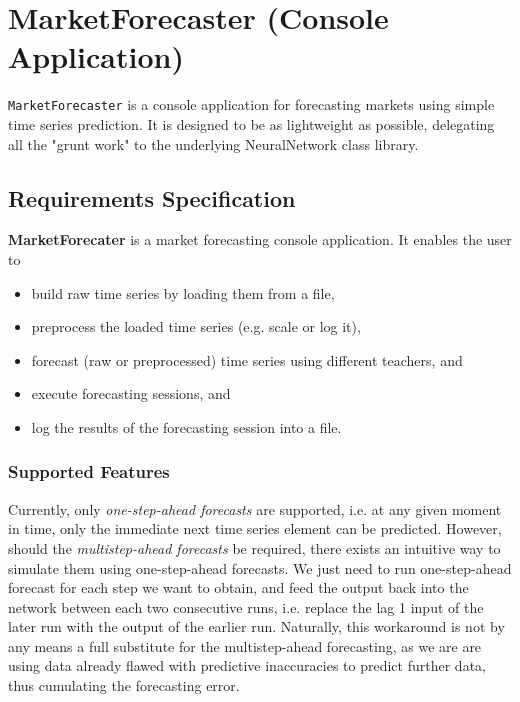 \chapter{MarketForecaster (Console Application)}

\texttt{MarketForecaster} is a console application for forecasting markets using simple time series prediction. It is designed to be as lightweight as possible, delegating all the "grunt work" to the underlying NeuralNetwork class library.

\section{Requirements Specification}

\textbf{MarketForecater} is a market forecasting console application. It enables the user to
\begin{itemize}
\item build raw time series by loading them from a file,
\item preprocess the loaded time series (e.g. scale or log it),
\item forecast (raw or preprocessed) time series using different teachers, and
\item execute forecasting sessions, and
\item log the results of the forecasting session into a file.
\end{itemize}

\subsection{Supported Features}

Currently, only \textit{one-step-ahead forecasts} are supported, i.e. at any given moment in time, only the immediate next time series element can be predicted. However, should the \textit{multistep-ahead forecasts} be required, there exists an intuitive way to simulate them using one-step-ahead forecasts. We just need to run one-step-ahead forecast for each step we want to obtain, and feed the output back into the network between each two consecutive runs, i.e. replace the lag 1 input of the later run with the output of the earlier run. Naturally, this workaround is not by any means a full substitute for the multistep-ahead forecasting, as we are are using data already flawed with predictive inaccuracies to predict further data, thus cumulating the forecasting error. 

